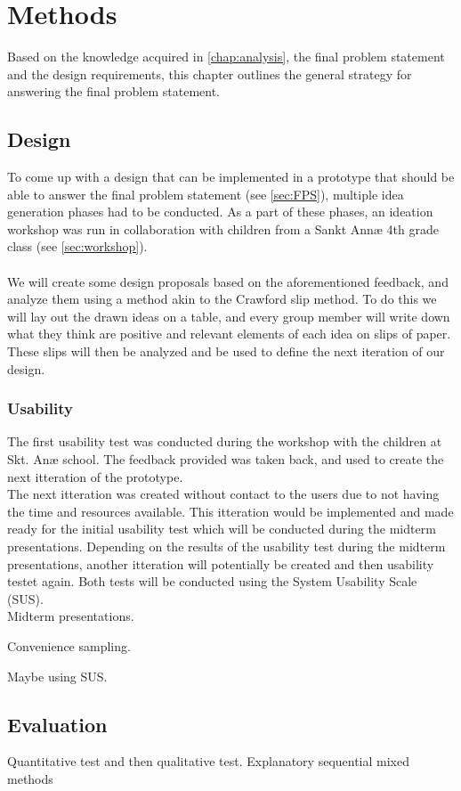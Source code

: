 \chapter{Methods}
Based on the knowledge acquired in \autoref{chap:analysis}, the final problem statement and the design requirements, this chapter outlines the general strategy for answering the final problem statement.
\section{Design}
To come up with a design that can be implemented in a prototype that should be able to answer the final problem statement (see \autoref{sec:FPS}), multiple idea generation phases had to be conducted. As a part of these phases, an ideation workshop was run in collaboration with children from a Sankt Annæ 4th grade class (see \autoref{sec:workshop}).\\\\
We will create some design proposals based on the aforementioned feedback, and analyze them using a method akin to the Crawford slip method\cite{crawfordSlip}. To do this we will lay out the drawn ideas on a table, and every group member will write down what they think are positive and relevant elements of each idea on slips of paper. These slips will then be analyzed and be used to define the next iteration of our design.

\subsection{Usability}
The first usability test was conducted during the workshop with the children at Skt. Anæ school. The feedback provided was taken back, and used to create the next itteration of the prototype. \\
The next itteration was created without contact to the users due to not having the time and resources available. This itteration would be implemented and made ready for the initial usability test which will be conducted during the midterm presentations. Depending on the results of the usability test during the midterm presentations, another itteration will potentially be created and then usability testet again. Both tests will be conducted using the System Usability Scale (SUS).
\\Midterm presentations.

Convenience sampling.

Maybe using SUS.

	
\section{Evaluation}
Quantitative test and then qualitative test.
Explanatory sequential mixed methods\cite[p.~21]{bjoernerBog}


